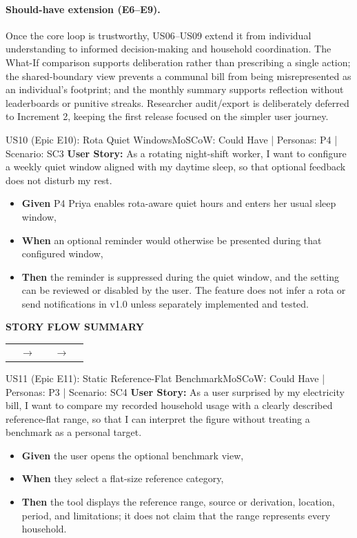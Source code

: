 \documentclass[12pt,a4paper]{article}
\makeatletter
\renewcommand{\arraystretch}{1.38}
\newcommand{\storyflow}[3]{%
  \par\Needspace{5\baselineskip}\vspace{0.08cm}%
  \begin{tcolorbox}[
    enhanced,width=\linewidth,
    colback=RowGray!72,colframe=RuleGray,
    boxrule=0.5pt,arc=1.2mm,
    borderline west={2pt}{0pt}{Teal},
    left=9pt,right=9pt,top=9pt,bottom=9pt,
    before skip=0pt,after skip=0pt
  ]
    {\sffamily\footnotesize\bfseries\color{Teal}STORY FLOW SUMMARY}\par
    \vspace{0.18cm}
    \renewcommand{\arraystretch}{1.0}%
    \begin{tabularx}{\linewidth}{@{}>{\centering\arraybackslash}X
      >{\centering\arraybackslash}p{0.52cm}
      >{\centering\arraybackslash}X
      >{\centering\arraybackslash}p{0.52cm}
      >{\centering\arraybackslash}X@{}}
      \fcolorbox{Teal!42}{white}{%
        \parbox[c][1.65cm][c]{\dimexpr\hsize-2\fboxsep-2\fboxrule\relax}{%
          \centering\sffamily\small\bfseries\color{Teal}01\par
          \vspace{3pt}\normalfont\small\color{Navy}#1}} &
      {\color{Teal}\normalsize$\to$} &
      \fcolorbox{Teal!42}{white}{%
        \parbox[c][1.65cm][c]{\dimexpr\hsize-2\fboxsep-2\fboxrule\relax}{%
          \centering\sffamily\small\bfseries\color{Teal}02\par
          \vspace{3pt}\normalfont\small\color{Navy}#2}} &
      {\color{Teal}\normalsize$\to$} &
      \fcolorbox{Teal!42}{white}{%
        \parbox[c][1.65cm][c]{\dimexpr\hsize-2\fboxsep-2\fboxrule\relax}{%
          \centering\sffamily\small\bfseries\color{Teal}03\par
          \vspace{3pt}\normalfont\small\color{Navy}#3}}
    \end{tabularx}
  \end{tcolorbox}
  \vspace{0.08cm}%
}
\makeatother
\begin{document}
\paragraph{Should-have extension (E6--E9).}
Once the core loop is trustworthy, US06--US09 extend it from individual understanding to informed decision-making and household coordination. The What-If comparison supports deliberation rather than prescribing a single action; the shared-boundary view prevents a communal bill from being misrepresented as an individual's footprint; and the monthly summary supports reflection without leaderboards or punitive streaks. Researcher audit/export is deliberately deferred to Increment 2, keeping the first release focused on the simpler user journey.

\Needspace{0.30\textheight}
\begin{storybox}{US10 (Epic E10): Rota Quiet Windows}{MoSCoW: Could Have | Personas: P4 | Scenario: SC3}
\textbf{User Story:} As a rotating night-shift worker, I want to configure a weekly quiet window aligned with my daytime sleep, so that optional feedback does not disturb my rest.
\begin{itemize}
    \item \textbf{Given} P4 Priya enables rota-aware quiet hours and enters her usual sleep window,
    \item \textbf{When} an optional reminder would otherwise be presented during that configured window,
    \item \textbf{Then} the reminder is suppressed during the quiet window, and the setting can be reviewed or disabled by the user. The feature does not infer a rota or send notifications in v1.0 unless separately implemented and tested.
\end{itemize}
\end{storybox}
\storyflow{Export session data locally}{Configure quiet window}{Suppress reminder during quiet hours}

\clearpage
\Needspace{0.30\textheight}
\begin{storybox}{US11 (Epic E11): Static Reference-Flat Benchmark}{MoSCoW: Could Have | Personas: P3 | Scenario: SC4}
\textbf{User Story:} As a user surprised by my electricity bill, I want to compare my recorded household usage with a clearly described reference-flat range, so that I can interpret the figure without treating a benchmark as a personal target.
\begin{itemize}
    \item \textbf{Given} the user opens the optional benchmark view,
    \item \textbf{When} they select a flat-size reference category,
    \item \textbf{Then} the tool displays the reference range, source or derivation, location, period, and limitations; it does not claim that the range represents every household.
\end{itemize}
\end{storybox}
\end{document}
